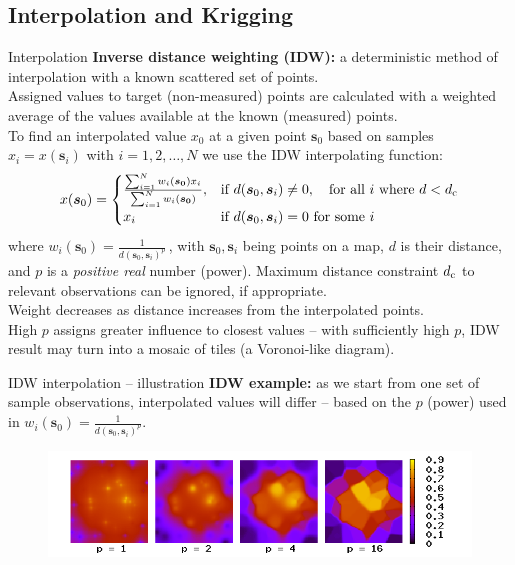 \documentclass{beamer}
\begin{document}
\subsection{Interpolation and Krigging}
\begin{frame}{Interpolation}
\small
\textbf{Inverse distance weighting (IDW):} a deterministic method of interpolation with a known scattered set of points. \\ \smallskip Assigned values to target (non-measured) points are calculated with a weighted average of the values available at the known (measured) points.
\\ \smallskip 
To find an interpolated value $x_0$ at a given point $\bm{s}_0$ based on samples $x_i=x(\bm{s}_i)$ with $i=1,2,\dots,N$ we use the IDW interpolating function:
$$
x(\bm{s}_0) = 
\begin{cases}
    \frac{\sum_{i=1}^N w_i(\bm{s_0})x_i}{\sum_{i=1}^N w_i(\bm{s_0})}, & 
    \textnormal{if~} d(\bm{s}_0,\bm{s}_i) \neq 0,  \textnormal{~~~for all~}i \textnormal{~where~} d < d_{\textnormal{c}}\\
    x_i & \textnormal{if~} d(\bm{s}_0,\bm{s}_i)=0 \textnormal{~for some~}i \, 
\end{cases} 
$$
where $w_i(\bm{s}_0)=\frac{1}{d(\bm{s}_0,\bm{s}_i)^p}\,$, with $\bm{s}_0, \bm{s}_i$ being points on a map, $d$ is their distance, and $p$ is a \textit{positive real} number (power). Maximum distance constraint $d_{\textnormal{c}}$ to relevant observations can be ignored, if appropriate. \\ \medskip
Weight decreases as distance increases from the interpolated points. \\High $p$ assigns greater influence to closest values -- with sufficiently high $p$, IDW result may turn into a mosaic of tiles (a Voronoi-like diagram). 
\end{frame}
\begin{frame}{IDW interpolation -- illustration}
\textbf{IDW example:} as we start from one set of  sample observations, interpolated values will differ -- based on the $p$ (power) used in  $w_i(\bm{s}_0)=\frac{1}{d(\bm{s}_0,\bm{s}_i)^p}$. 
\begin{figure}
	\includegraphics[width=.9\textwidth]{IMG/sp_idw.png}
\end{figure}
\end{frame}
\end{document}
